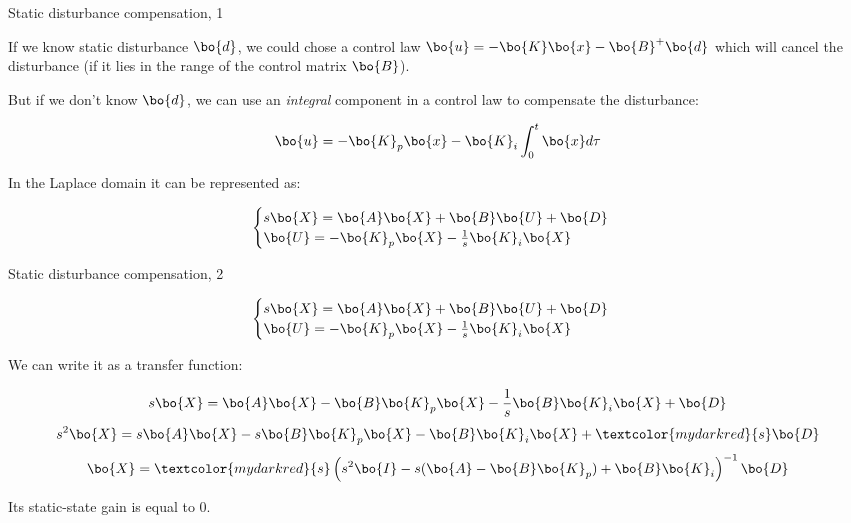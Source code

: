 \documentclass{beamer}
\begin{document}
\begin{frame}{Static disturbance compensation, 1}
	\begin{flushleft}
		
		If we know static disturbance $\bo{d}$, we could chose a control law $\bo{u} = -\bo{K}\bo{x} - \bo{B}^+\bo{d}$ which will cancel the disturbance (if it lies in the range of the control matrix $\bo{B}$).
		
		\bigskip
		
		But if we don't know $\bo{d}$, we can use an \emph{integral} component in a control law to compensate the disturbance:
		
		\begin{equation}
			\bo{u} = -\bo{K}_p\bo{x} -\bo{K}_i \int_{0}^{t} \bo{x} d \tau
		\end{equation}
		
		In the Laplace domain it can be represented as:
		
		
		\begin{equation}
			\begin{cases}
				s \bo{X} = \bo{A} \bo{X} + \bo{B} \bo{U} + \bo{D} \\
				\bo{U} = -\bo{K}_p\bo{X} -\frac{1}{s}\bo{K}_i \bo{X}
			\end{cases}
		\end{equation}
		
		
	\end{flushleft}
\end{frame}



\begin{frame}{Static disturbance compensation, 2}
	\begin{flushleft}
		
		\begin{equation}
			\begin{cases}
				s \bo{X} = \bo{A} \bo{X} + \bo{B} \bo{U} + \bo{D} \\
				\bo{U} = -\bo{K}_p\bo{X} -\frac{1}{s}\bo{K}_i \bo{X}
			\end{cases}
		\end{equation}
		
		We can write it as a transfer function:
		
		\begin{equation}
				s \bo{X} = \bo{A} \bo{X} -\bo{B}\bo{K}_p\bo{X} -\frac{1}{s}\bo{B}\bo{K}_i \bo{X} + \bo{D}
		\end{equation}
		\begin{equation}
		s^2 \bo{X} = s\bo{A} \bo{X} -s\bo{B}\bo{K}_p\bo{X} -\bo{B}\bo{K}_i \bo{X} + \textcolor{mydarkred}{s} \bo{D}
		\end{equation}
		\begin{equation}
		 \bo{X} = \textcolor{mydarkred}{s}
		  \left(
		 s^2 \bo{I} - s(\bo{A} - \bo{B}\bo{K}_p) + \bo{B}\bo{K}_i 
		 \right)^{-1}
		 \bo{D}
		\end{equation}
		
		Its static-state gain is equal to 0.
		
		
	\end{flushleft}
\end{frame}
\end{document}
